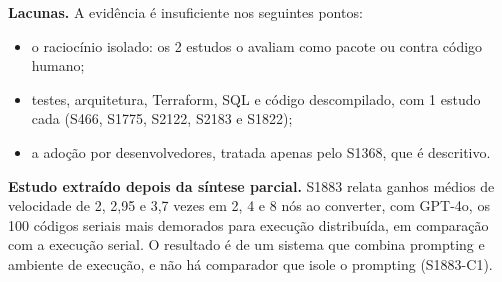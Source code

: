 \textbf{Lacunas.} A evidência é insuficiente nos seguintes pontos:
\begin{itemize}
  \item o raciocínio isolado: os 2 estudos o avaliam como pacote ou contra código humano;
  \item testes, arquitetura, Terraform, SQL e código descompilado, com 1 estudo cada (S466, S1775, S2122, S2183 e S1822);
  \item a adoção por desenvolvedores, tratada apenas pelo S1368, que é descritivo.
\end{itemize}

\textbf{Estudo extraído depois da síntese parcial.}
S1883 relata ganhos médios de velocidade de 2, 2,95 e 3,7 vezes em 2, 4 e 8 nós ao converter, com GPT-4o, os 100
códigos seriais mais demorados para execução distribuída, em comparação com a execução serial. O resultado é de um
sistema que combina prompting e ambiente de execução, e não há comparador que isole o prompting (S1883-C1).
